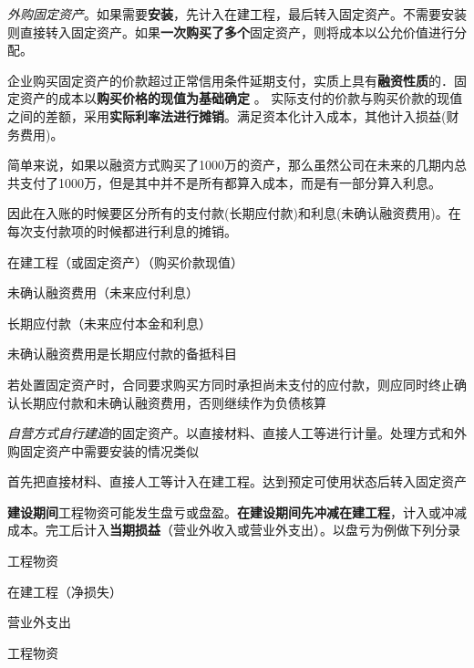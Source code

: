 \documentclass[UTF8,12pt]{ctexart}
\newenvironment{Dr}{%
	\begin{list}{}%
		{
			\setlength{\leftmargin}{2em}
			\setlength{\labelwidth}{2em}
			\setlength{\labelsep}{0pt}
			\setlength{\itemindent}{0pt}
			\setlength{\listparindent}{0pt}
			\setlength{\parsep}{0pt}
			\setlength{\topsep}{0pt}
		}
		\item[\textbf{借：}]
	}{%
	\end{list}
}
\newenvironment{Cr}{%
	\begin{list}{}%
		{
			\setlength{\leftmargin}{3em}
			\setlength{\labelwidth}{2em}
			\setlength{\labelsep}{0pt}
			\setlength{\itemindent}{0pt}
			\setlength{\listparindent}{0pt}
			\setlength{\parsep}{0pt}
			\setlength{\topsep}{0pt}
		}
		\item[\textbf{贷：}]
	}{%
	\end{list}
}
\numberwithin{equation}{section} %
\numberwithin{figure}{section}
\numberwithin{table}{section}
\begin{document}
	\begin{enumerate}
		\item \textit{外购固定资产}。如果需要\textbf{安装}，先计入在建工程，最后转入固定资产。不需要安装则直接转入固定资产。如果\textbf{一次购买了多个}固定资产，则将成本以公允价值进行分配。
		
		企业购买固定资产的价款超过正常信用条件延期支付，实质上具有\textbf{融资性质}的．固定资产的成本以\textbf{购买价格的现值为基础确定} 。 实际支付的价款与购买价款的现值之间的差额，采用\textbf{实际利率法进行摊销}。满足资本化计入成本，其他计入损益(财务费用)。
		
		简单来说，如果以融资方式购买了1000万的资产，那么虽然公司在未来的几期内总共支付了1000万，但是其中并不是所有都算入成本，而是有一部分算入利息。
		
		因此在入账的时候要区分所有的支付款(长期应付款)和利息(未确认融资费用)。在每次支付款项的时候都进行利息的摊销。
		
		\begin{Dr}
			在建工程（或固定资产）（购买价款现值）
			
			未确认融资费用（未来应付利息）
		\end{Dr}
		\begin{Cr}
			长期应付款（未来应付本金和利息）
		\end{Cr}
		
		未确认融资费用是长期应付款的备抵科目
		
		若处置固定资产时，合同要求购买方同时承担尚未支付的应付款，则应同时终止确认长期应付款和未确认融资费用，否则继续作为负债核算
		
		\item \textit{自营方式自行建造}的固定资产。以直接材料、直接人工等进行计量。处理方式和外购固定资产中需要安装的情况类似
		
		首先把直接材料、直接人工等计入在建工程。达到预定可使用状态后转入固定资产
		
		\textbf{建设期间}工程物资可能发生盘亏或盘盈。\textbf{在建设期间先冲减在建工程}，计入或冲减成本。完工后计入\textbf{当期损益}（营业外收入或营业外支出）。以盘亏为例做下列分录
		
		\begin{Dr}
			工程物资
		\end{Dr}
		\begin{Cr}
			在建工程（净损失）
		\end{Cr}
		
		\begin{Dr}
			营业外支出
		\end{Dr}
		\begin{Cr}
			工程物资
		\end{Cr}
		

\end{enumerate}
\end{document}

